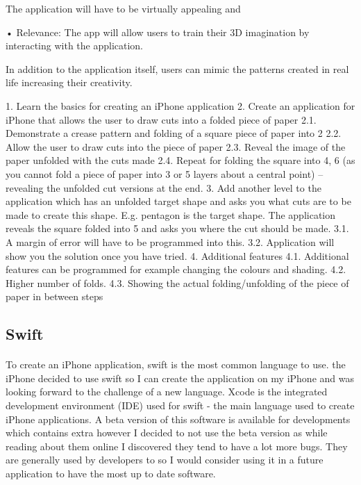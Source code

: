 \documentclass[11pt]{article}
\begin{document}
The application will have to be virtually appealing and


• Relevance: The app will allow users to train their 3D imagination by interacting with the application. 

In addition to the application itself, users can mimic the patterns created in real life increasing their creativity.

                 1. Learn the basics for creating an iPhone application
2. Create an application for iPhone that allows the user to draw cuts into a folded piece of
paper
2.1. Demonstrate a crease pattern and folding of a square piece of paper into 2
2.2. Allow the user to draw cuts into the piece of paper
2.3. Reveal the image of the paper unfolded with the cuts made
2.4. Repeat for folding the square into 4, 6 (as you cannot fold a piece of paper into 3 or
5 layers about a central point) – revealing the unfolded cut versions at the end.
3. Add another level to the application which has an unfolded target shape and asks you what cuts are to be made to create this shape. E.g. pentagon is the target shape. The
application reveals the square folded into 5 and asks you where the cut should be made. 3.1. A margin of error will have to be programmed into this.
3.2. Application will show you the solution once you have tried.
4. Additional features
4.1. Additional features can be programmed for example changing the colours and
shading.
4.2. Higher number of folds.
4.3. Showing the actual folding/unfolding of the piece of paper in between steps
                 
            \subsection{Swift}
               
                \paragraph{} 
                    To create an iPhone application, swift is the most common language to use.  the iPhone decided to use swift so I can create the application on my iPhone and was looking forward to the challenge of a new language. Xcode is the integrated development environment (IDE) used for swift - the main language used to create iPhone applications. A beta version of this software is available for developments which contains extra however I decided to not use the beta version as while reading about them online I discovered they tend to have a lot more bugs. They are generally used by developers to so I would consider using it in a future application to have the most up to date software.
\end{document}
